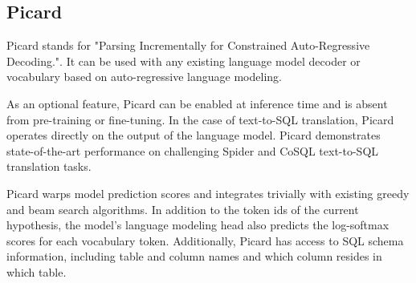 \subsection*{Picard}

Picard\cite{scholak_picard_2021} stands for "Parsing Incrementally for Constrained Auto-Regressive Decoding.". It can be used with any existing language model decoder or vocabulary based on auto-regressive language modeling.

As an optional feature, Picard can be enabled at inference time and is absent from pre-training or fine-tuning. In the case of text-to-SQL translation, Picard operates directly on the output of the language model.
Picard demonstrates state-of-the-art performance on challenging Spider and CoSQL text-to-SQL translation tasks.

Picard warps model prediction scores and integrates trivially with existing greedy and beam search algorithms. In addition to the token ids of the current hypothesis, the model's language modeling head also predicts the log-softmax scores for each vocabulary token. Additionally, Picard has access to SQL schema information, including table and column names and which column resides in which table.
